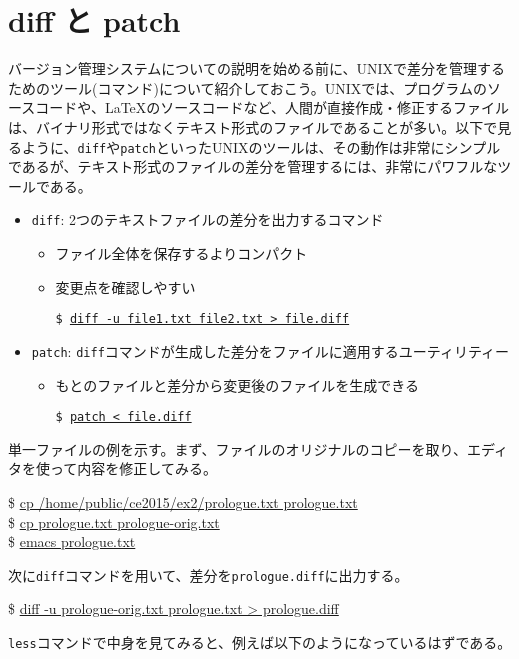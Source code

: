 \documentclass[a4j]{jsbook}
\newcommand{\prompt}{\$ }
\newenvironment{commandline2}{%
  \begin{tcolorbox}\tt%
}{%
  \end{tcolorbox}%
}
\begin{document}
\section{diff と patch}

バージョン管理システムについての説明を始める前に、UNIXで差分を管理するためのツール(コマンド)について紹介しておこう。UNIXでは、プログラムのソースコードや、\LaTeX のソースコードなど、人間が直接作成・修正するファイルは、バイナリ形式ではなくテキスト形式のファイルであることが多い。以下で見るように、{\tt diff}や{\tt patch}といったUNIXのツールは、その動作は非常にシンプルであるが、テキスト形式のファイルの差分を管理するには、非常にパワフルなツールである。

\begin{itemize}
\item {\tt diff}: 2つのテキストファイルの差分を出力するコマンド
  \begin{itemize}
  \item ファイル全体を保存するよりコンパクト
  \item 変更点を確認しやすい
    
    {\tt \$ \underline{diff -u file1.txt file2.txt > file.diff}}
  \end{itemize}
\item {\tt patch}: {\tt diff}コマンドが生成した差分をファイルに適用するユーティリティー
  \begin{itemize}
  \item もとのファイルと差分から変更後のファイルを生成できる
    
    {\tt \$ \underline{patch < file.diff}}
  \end{itemize}
\end{itemize}
単一ファイルの例を示す。まず、ファイルのオリジナルのコピーを取り、エディタを使って内容を修正してみる。
\begin{commandline2}
  \prompt \underline{cp /home/public/ce2015/ex2/prologue.txt prologue.txt} \\
  \prompt \underline{cp prologue.txt prologue-orig.txt} \\
  \prompt \underline{emacs prologue.txt}
\end{commandline2} \noindent
次に{\tt diff}コマンドを用いて、差分を{\tt prologue.diff}に出力する。
\begin{commandline2}
  \prompt \underline{diff -u prologue-orig.txt prologue.txt > prologue.diff}
\end{commandline2} \noindent
{\tt less}コマンドで中身を見てみると、例えば以下のようになっているはずである。
\end{document}
